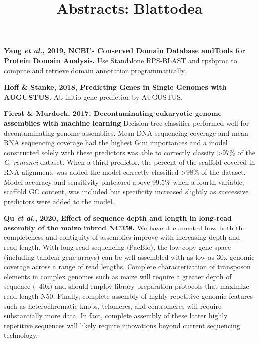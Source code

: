 \documentclass[11pt]{article}
\title{Abstracts: Blattodea}
\author{}
\date{}
\begin{document}
\begin{sloppypar}
  \maketitle

  \linenumbers
\textbf{Yang \textit{et al.}, 2019, NCBI’s Conserved Domain Database andTools for Protein Domain Analysis.} \newline
Use Standalone RPS-BLAST and rpsbproc to compute and retrieve domain annotation programmatically.
\par
\textbf{Hoff & Stanke, 2018, Predicting Genes in Single Genomes with AUGUSTUS.} \newline
Ab initio gene prediction by AUGUSTUS.
\par
\textbf{Fierst & Murdock, 2017, Decontaminating eukaryotic genome assemblies with machine learning} \newline
Decision tree classifier performed well for decontaminating genome assemblies. 
Mean DNA sequencing coverage and mean RNA sequencing coverage had the highest Gini importances and a model constructed solely with these predictors was able to correctly classify >97\% of the \textit{C. remanei} dataset. 
When a third predictor, the percent of the scaffold covered in RNA alignment, was added the model correctly classified >98\% of the dataset. 
Model accuracy and sensitivity plateaued above 99.5\% when a fourth variable, scaffold GC content, was included but specificity increased slightly as successive predictors were added to the model. 
\par
\textbf{Qu \textit{et al.}, 2020, Effect of sequence depth and length in long-read assembly of the maize inbred NC358.} \newline
We have documented how both the completeness and contiguity of assemblies improve with increasing depth and read length. 
With long-read sequencing (PacBio), the low-copy gene space (including tandem gene arrays) can be well assembled with as low as 30x genomic coverage across a range of read lengths. 
Complete characterization of transposon elements in complex genomes such as maize will require a greater depth of sequence (~40x) and should employ library preparation protocols that maximize read-length N50. 
Finally, complete assembly of highly repetitive genomic features such as heterochromatic knobs, telomeres, and centromeres will require substantially more data. 
In fact, complete assembly of these latter highly repetitive sequences will likely require innovations beyond current sequencing technology.

\end{sloppypar}
\end{document}

